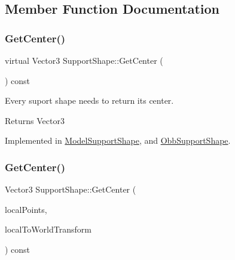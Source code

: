 \subsection{Member Function Documentation}
\mbox{\label{classSupportShape_ac81f62a38aeadbf03d637e5134479467}} 
\subsubsection{\texorpdfstring{Get\+Center()}{GetCenter()}\hspace{0.1cm}{\footnotesize\ttfamily [1/2]}}
{\footnotesize\ttfamily virtual Vector3 Support\+Shape\+::\+Get\+Center (\begin{DoxyParamCaption}{ }\end{DoxyParamCaption}) const\hspace{0.3cm}{\ttfamily [pure virtual]}}



Every suport shape needs to return its center. 

\begin{DoxyReturn}{Returns}
Vector3 
\end{DoxyReturn}


Implemented in \hyperlink{classModelSupportShape_a006fee2a4fca1a9b15194512a072a8e0}{Model\+Support\+Shape}, and \hyperlink{classObbSupportShape_a0e18c90f510e3829d73e8b4478e68a81}{Obb\+Support\+Shape}.

\mbox{\label{classSupportShape_a2cda78c3f08e49269c830d6ab0595244}} 
\subsubsection{\texorpdfstring{Get\+Center()}{GetCenter()}\hspace{0.1cm}{\footnotesize\ttfamily [2/2]}}
{\footnotesize\ttfamily Vector3 Support\+Shape\+::\+Get\+Center (\begin{DoxyParamCaption}\item[{const std\+::vector$<$ \hyperlink{structVertexData}{Vertex\+Data} $>$ \&}]{local\+Points,  }\item[{const Matrix \&}]{local\+To\+World\+Transform }\end{DoxyParamCaption}) const}



